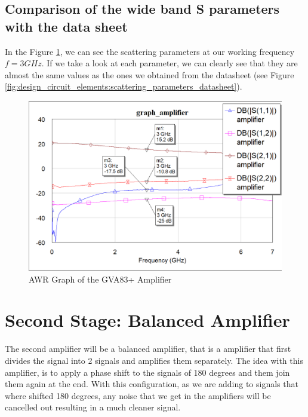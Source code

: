 \documentclass[12pt]{report} %
\begin{document}
\subsection{Comparison of the wide band S parameters with the data sheet}

In the Figure \ref{fig:design_circuit_elements:graph_amplifier}, we can see the scattering parameters at our working frequency $f = 3 GHz$. If we take a look at each parameter, we can clearly see that they are almost the same values as the ones we obtained from the datasheet (see Figure \ref{fig:design_circuit_elements:scattering_parameters_datasheet}).

\begin{figure}[htbp]
    \centering
    \includegraphics[width=\textwidth]{images/design_circuit_elements/graph_amplifier.png}
    \caption{AWR Graph of the GVA83+ Amplifier}
    \label{fig:design_circuit_elements:graph_amplifier}
\end{figure}

\section{Second Stage: Balanced Amplifier}

The second amplifier will be a balanced amplifier, that is a amplifier that first divides the signal into 2 signals and amplifies them separately. The idea with this amplifier, is to apply a phase shift to the signals of 180 degrees and them join them again at the end. With this configuration, as we are adding to signals that where shifted 180 degrees, any noise that we get in the amplifiers will be cancelled out resulting in a much cleaner signal.
\end{document}
